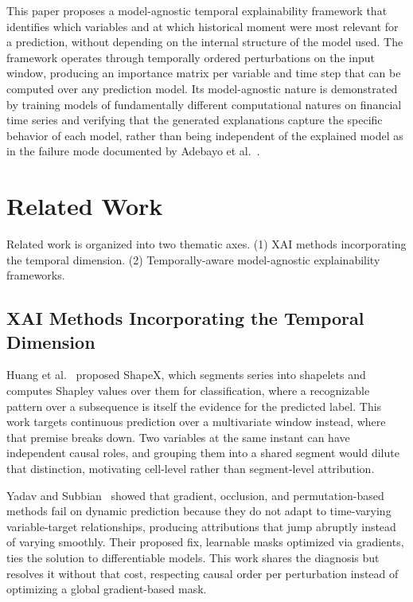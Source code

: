 \documentclass[runningheads]{llncs}
\begin{document}
This paper proposes a model-agnostic temporal explainability
framework that identifies which variables and at which historical
moment were most relevant for a prediction, without depending on
the internal structure of the model used. The framework operates
through temporally ordered perturbations on the input window,
producing an importance matrix per variable and time step that can
be computed over any prediction model. Its model-agnostic nature
is demonstrated by training models of fundamentally different
computational natures on financial time series and verifying that
the generated explanations capture the specific behavior of each
model, rather than being independent of the explained model as in
the failure mode documented by Adebayo et al.~\cite{adebayo2018}.

\section{Related Work}
\label{sec:related_work}

Related work is organized into two thematic axes. (1) XAI methods
incorporating the temporal dimension. (2) Temporally-aware
model-agnostic explainability frameworks.

\subsection{XAI Methods Incorporating the Temporal Dimension}

Huang et al.~\cite{huang2025} proposed ShapeX, which segments series
into shapelets and computes Shapley values over them for
classification, where a recognizable pattern over a subsequence is
itself the evidence for the predicted label. This work targets
continuous prediction over a multivariate window instead, where that
premise breaks down. Two variables at the same instant can have
independent causal roles, and grouping them into a shared segment
would dilute that distinction, motivating cell-level rather than
segment-level attribution.

Yadav and Subbian~\cite{yadav2025} showed that gradient, occlusion,
and permutation-based methods fail on dynamic prediction because they
do not adapt to time-varying variable-target relationships, producing
attributions that jump abruptly instead of varying smoothly. Their
proposed fix, learnable masks optimized via gradients, ties the
solution to differentiable models. This work shares the diagnosis but
resolves it without that cost, respecting causal order per
perturbation instead of optimizing a global gradient-based mask.
\end{document}

